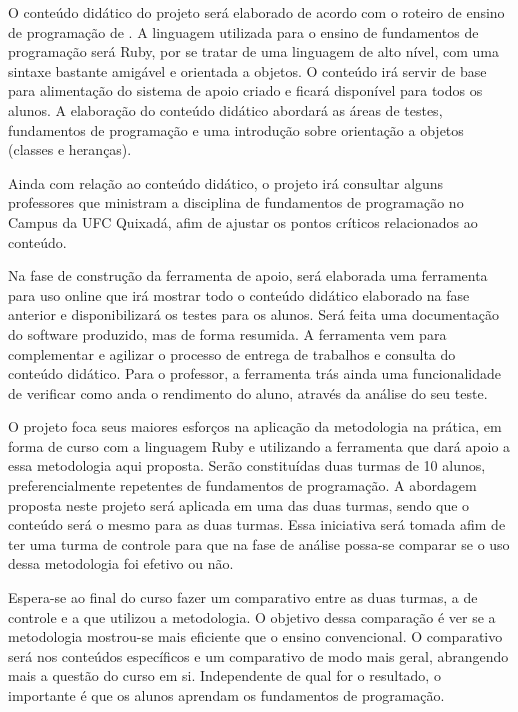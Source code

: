 \documentclass[pnumabnt,normaltoc,espacoumemeio,capchap]{abnt}
\begin{document}
\par O conteúdo didático do projeto será elaborado de acordo com o roteiro de ensino de programação de . A linguagem utilizada para o ensino de fundamentos de programação será Ruby, por se tratar de uma linguagem de alto nível, com uma sintaxe bastante amigável e orientada a objetos. O conteúdo irá servir de base para alimentação do sistema de apoio criado e ficará disponível para todos os alunos. A elaboração do conteúdo didático abordará as áreas de testes, fundamentos de programação e uma introdução sobre orientação a objetos (classes e heranças).
\par Ainda com relação ao conteúdo didático, o projeto irá consultar alguns professores que ministram a disciplina de fundamentos de programação no Campus da UFC Quixadá, afim de ajustar os pontos críticos relacionados ao conteúdo.
\par Na fase de construção da ferramenta de apoio, será elaborada uma ferramenta para uso online que irá mostrar todo o conteúdo didático elaborado na fase anterior e disponibilizará os testes para os alunos. Será feita uma documentação do software produzido, mas de forma resumida. A ferramenta vem para complementar e agilizar o processo de entrega de trabalhos e consulta do conteúdo didático. Para o professor, a ferramenta trás ainda uma funcionalidade de verificar como anda o rendimento do aluno, através da análise do seu teste.
\par O projeto foca seus maiores esforços na aplicação da metodologia na prática, em forma de curso com a linguagem Ruby e utilizando a ferramenta que dará apoio a essa metodologia aqui proposta. Serão constituídas duas turmas de 10 alunos, preferencialmente repetentes de fundamentos de programação. A abordagem proposta neste projeto será aplicada em uma das duas turmas, sendo que o conteúdo será o mesmo para as duas turmas. Essa iniciativa será tomada afim de ter uma turma de controle para que na fase de análise possa-se comparar se o uso dessa metodologia foi efetivo ou não.
\par Espera-se ao final do curso fazer um comparativo entre as duas turmas, a de controle e a que utilizou a metodologia. O objetivo dessa comparação é ver se a metodologia mostrou-se mais eficiente que o ensino convencional. O comparativo será nos conteúdos específicos e um comparativo de modo mais geral, abrangendo mais a questão do curso em si. Independente de qual for o resultado, o importante é que os alunos aprendam os fundamentos de programação.
\end{document}
